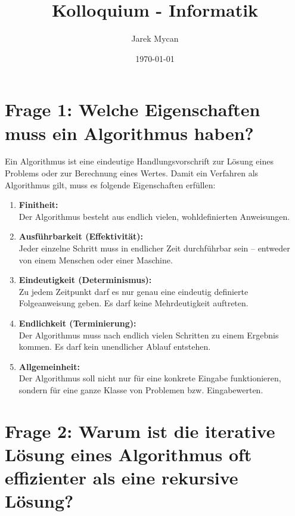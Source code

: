 \documentclass{article}
\title{}
\author{}
\date{}
\begin{document}
	\title{Kolloquium - Informatik }
	\author{Jarek Mycan}
	\date{\today}
	\maketitle
	
\section*{Frage 1: Welche Eigenschaften muss ein Algorithmus haben?}

Ein Algorithmus ist eine eindeutige Handlungsvorschrift zur Lösung eines Problems oder zur Berechnung eines Wertes. Damit ein Verfahren als Algorithmus gilt, muss es folgende Eigenschaften erfüllen:

\begin{enumerate}
	\item \textbf{Finitheit:} \\
	Der Algorithmus besteht aus endlich vielen, wohldefinierten Anweisungen.
	
	\item \textbf{Ausführbarkeit (Effektivität):} \\
	Jeder einzelne Schritt muss in endlicher Zeit durchführbar sein – entweder von einem Menschen oder einer Maschine.
	
	\item \textbf{Eindeutigkeit (Determinismus):} \\
	Zu jedem Zeitpunkt darf es nur genau eine eindeutig definierte Folgeanweisung geben. Es darf keine Mehrdeutigkeit auftreten.
	
	\item \textbf{Endlichkeit (Terminierung):} \\
	Der Algorithmus muss nach endlich vielen Schritten zu einem Ergebnis kommen. Es darf kein unendlicher Ablauf entstehen.
	
	\item \textbf{Allgemeinheit:} \\
	Der Algorithmus soll nicht nur für eine konkrete Eingabe funktionieren, sondern für eine ganze Klasse von Problemen bzw. Eingabewerten.
\end{enumerate}

\section*{Frage 2: Warum ist die iterative Lösung eines Algorithmus oft effizienter als eine rekursive Lösung?}
	
\end{document}

